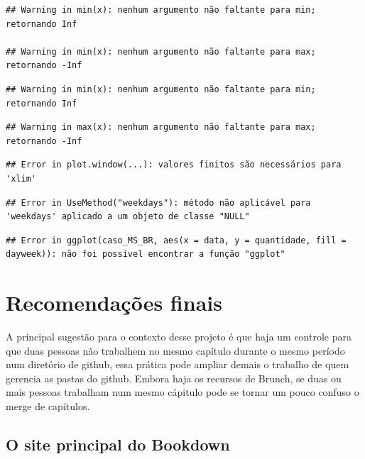 \documentclass[
]{book}
\begin{document}
\begin{verbatim}
## Warning in min(x): nenhum argumento não faltante para min; retornando Inf

## Warning in min(x): nenhum argumento não faltante para max; retornando -Inf
\end{verbatim}

\begin{verbatim}
## Warning in min(x): nenhum argumento não faltante para min; retornando Inf
\end{verbatim}

\begin{verbatim}
## Warning in max(x): nenhum argumento não faltante para max; retornando -Inf
\end{verbatim}

\begin{verbatim}
## Error in plot.window(...): valores finitos são necessários para 'xlim'
\end{verbatim}

\begin{verbatim}
## Error in UseMethod("weekdays"): método não aplicável para 'weekdays' aplicado a um objeto de classe "NULL"
\end{verbatim}

\begin{verbatim}
## Error in ggplot(caso_MS_BR, aes(x = data, y = quantidade, fill = dayweek)): não foi possível encontrar a função "ggplot"
\end{verbatim}

\hypertarget{recomendauxe7uxf5es-finais}{%
\chapter{Recomendações finais}\label{recomendauxe7uxf5es-finais}}

A principal sugestão para o contexto desse
projeto é que haja um controle para que duas
pessoas não trabalhem no mesmo capítulo
durante o mesmo período num diretório de
github, essa prática pode ampliar demais o
trabalho de quem gerencia as pastas do
github. Embora haja os recursos de Brunch,
se duas ou mais pessoas trabalham num mesmo
cápitulo pode se tornar um pouco confuso o
merge de capítulos.

\hypertarget{o-site-principal-do-bookdown}{%
\section{O site principal do Bookdown}\label{o-site-principal-do-bookdown}}
\end{document}
